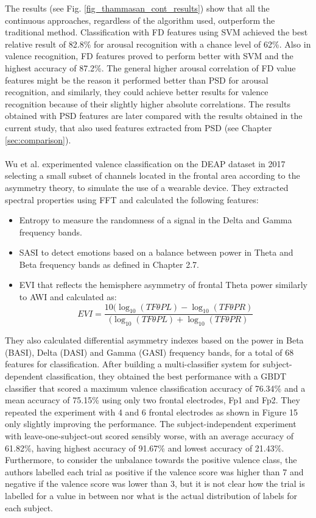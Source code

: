 The results (see Fig. \ref{fig_thammasan_cont_results}) show that all the continuous approaches, regardless of the algorithm used, outperform the traditional method. Classification with \ac{FD} features using \ac{SVM} achieved the best relative result of 82.8\% for arousal recognition with a chance level of 62\%. Also in valence recognition, \ac{FD} features proved to perform better with \ac{SVM} and the highest accuracy of 87.2\%. The general higher arousal correlation of \ac{FD} value features might be the reason it performed better than \ac{PSD} for arousal recognition, and similarly, they could achieve better results for valence recognition because of their slightly higher absolute correlations. The results obtained with \ac{PSD} features are later compared with the results obtained in the current study, that also used features extracted from \ac{PSD} (see Chapter \ref{sec:comparison}).
\\
\\
Wu et al. \cite{wu_estimation_2017}  experimented valence classification on the DEAP dataset \cite{koelstra_deap_2012} in 2017 selecting a small subset of channels located in the frontal area according to the asymmetry theory, to simulate the use of a wearable device.
They extracted spectral properties using \ac{FFT} and calculated the following features:
\begin{itemize}
\item 	Entropy to measure the randomness of a signal in the Delta and Gamma frequency bands.
\item 	\ac{SASI} to detect emotions based on a balance between power in Theta and Beta frequency bands as defined in Chapter 2.7.
\item 	\ac{EVI} that reflects the hemisphere asymmetry of frontal Theta power similarly to \ac{AWI} and  calculated as: \[EVI=\frac{10(\log_{10}(TF\theta PL) - \log_{10}(TF\theta PR)}{(\log_{10}(TF\theta PL) + \log_{10}(TF\theta PR)}\]
\end{itemize}
They also calculated differential asymmetry indexes based on the power in Beta (BASI), Delta (DASI) and Gamma (GASI) frequency bands, for a total of 68 features for classification. After building a multi-classifier system for subject-dependent classification, they obtained the best performance with a \ac{GBDT} classifier that scored a maximum valence classification accuracy of 76.34\% and a mean accuracy of 75.15\% using only two frontal electrodes, Fp1 and Fp2. They repeated the experiment with 4 and 6 frontal electrodes as shown in Figure 15 only slightly improving the performance.  The subject-independent experiment with leave-one-subject-out scored sensibly worse, with an average accuracy of 61.82\%, having highest accuracy of 91.67\% and lowest accuracy of 21.43\%. Furthermore, to consider the unbalance towards the positive valence class, the authors labelled each trial as positive if the valence score was higher than 7 and negative if the valence score was lower than 3, but it is not clear how the trial is labelled for a value in between nor what is the actual distribution of labels for each subject.

